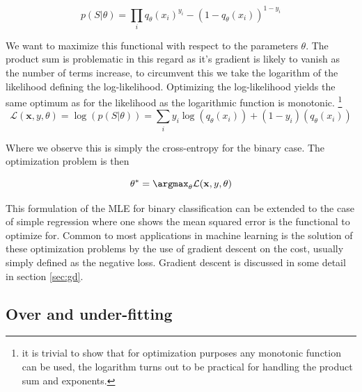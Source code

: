 \begin{equation}\label{eq:likelihood}
p(S | \theta) = \prod_i q_\theta(x_i)^{y_i} - (1-q_\theta(x_i))^{1-y_i}
\end{equation}

\noindent We want to maximize this functional with respect to the parameters $\theta$. The product sum is problematic in this regard as it's gradient is likely to vanish as the number of terms increase, to circumvent this we take the logarithm of the likelihood defining the log-likelihood. Optimizing the log-likelihood yields the same optimum as for the likelihood as the logarithmic function is monotonic. \footnote{it is trivial to show that for optimization purposes any monotonic function can be used, the logarithm turns out to be practical for handling the product sum and exponents.}
\begin{equation}
\mathcal{L}(\mathbf{x}, y, \theta) = \log(p(S | \theta)) = \sum_i y_i\log(q_\theta(x_i)) + (1-y_i)(q_\theta(x_i))
\end{equation}

\noindent Where we observe this is simply the cross-entropy for the binary case. The optimization problem is then 

\begin{equation}
\theta^* = \argmax_\theta \mathcal{L}(\mathbf{x}, y, \theta )
\end{equation}

\noindent This formulation of the MLE for binary classification can be extended to the case of simple regression where one shows the mean squared error is the functional to optimize for. Common to most applications in machine learning is the solution of these optimization problems by the use of gradient descent on the cost, usually simply defined as the negative loss. Gradient descent is discussed in some detail in section \ref{sec:gd}.

\subsection{Over and under-fitting}\label{sec:fitting}

